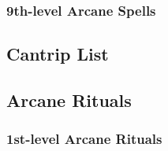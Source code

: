 \subsubsection{9th-level Arcane Spells}
\begin{swspelllist}

    \SLdisjoinmagic[Abjur]
    \SLshadowshield

    \SLavatarofblades[Conj]
    \SLdimensionalarmy
    \SLmaze

    \SLrevelation[Div]

    \SLirresistibledance[Ench]

    \SLmeteorswarm[Evoc]

    \SLshadowshield[Illus]

    \SLassimilate[Trans]
    \SLtimestop
    \SLtransmuteanyobject

    \SLassimilate[Vivi]
    \SLhorridwilting
    \SLwailofthebanshee

    \SLprismaticstorm[Univ]
\end{swspelllist}

\subsection{Cantrip List}\label{Cantrip List}
\begin{swspelllist}
    \SLresistdamage[Abjur]
    \SLacidorb[Conj]
    \SLconjureprojectile
    \SLtwistfate[Div]
    \SLcombattelekinesis[Evoc]
    \SLmagicray
    \SLflare[Illus]
    \SLaugmentattack[Trans]
    \SLdrainingtouch[Vivi]
    \SLexhaustion
\end{swspelllist}

\subsection{Arcane Rituals}\label{Arcane Rituals}
\subsubsection{1st-level Arcane Rituals}
\begin{rituallist}
    \SLendureelements[Abjur]
    \SLcreatewater[Conj]
    \SLmount
    \SLunseenservant
    \SLalarm[Div]
    \SLappraisal
    \SLidentify
    \SLreadmagic
    \SLfloatingdisk[Evoc]
    \SLdisguiseself[Illus]
    \SLlight
    \SLmagicaura
    \SLerase[Trans]
    \SLmending
    \SLpurifysustenance
    \SLunseenservant
    \SLarcanemark[Univ]
\end{rituallist}

